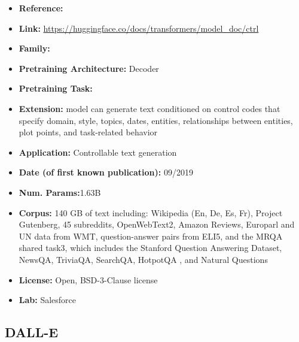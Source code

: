 \documentclass{article}
\begin{document}
            \begin{itemize}
                \item \textbf{Reference:} 
                \item \textbf{Link:} \url{https://huggingface.co/docs/transformers/model_doc/ctrl}
                \item \textbf{Family:} 
                \item \textbf{Pretraining Architecture:} Decoder
                \item \textbf{Pretraining Task:}
                \item \textbf{Extension:} model can generate text conditioned on control codes that specify domain, style, topics, dates, entities, relationships between entities, plot points, and task-related behavior  
                \item \textbf{Application:} Controllable text generation
                \item \textbf{Date (of first known publication):} 09/2019
                \item \textbf{Num. Params:}1.63B
                \item \textbf{Corpus:} 140 GB of text including: Wikipedia (En, De, Es, Fr), Project Gutenberg, 45 subreddits, OpenWebText2, Amazon Reviews, Europarl and UN data from WMT, question-answer pairs from ELI5, and the MRQA shared task3, which includes the Stanford Question Answering Dataset, NewsQA, TriviaQA, SearchQA, HotpotQA , and Natural Questions 
                \item \textbf{License:} Open, BSD-3-Clause license
                \item \textbf{Lab:} Salesforce
            \end{itemize}
            
\subsection{DALL-E}
\end{document}
